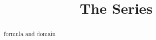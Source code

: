 \documentclass{ximera}
\title{The Series}
\begin{document}
\begin{abstract}
formula and domain
\end{abstract}
\maketitle
\end{document}
